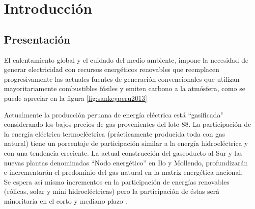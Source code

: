 

\chapter{Introducción}


\section{Presentación} %

El calentamiento global y el cuidado del medio ambiente, impone la necesidad de generar electricidad con recursos energéticos renovables que reemplacen progresivamente las actuales fuentes de generación convencionales que utilizan mayoritariamente combustibles fósiles y emiten carbono a la atmósfera, como se puede apreciar en la figura \ref{fig:sankeyperu2013}

Actualmente la producción peruana de energía eléctrica está “gasificada” considerando los bajos precios de gas provenientes  del lote 88. La participación de la energía eléctrica termoeléctrica (prácticamente producida toda con gas natural) tiene un porcentaje de participación similar a la energía hidroeléctrica y con una tendencia creciente. 
La actual construcción del gaseoducto al Sur y las nuevas plantas denominadas “Nodo energético” en Ilo y Mollendo, profundizarán e incrementarán el predominio del gas natural en la matriz energética nacional. Se espera así mismo incrementos en la participación de energías renovables (eólicas, solar y mini hidroeléctricas) pero  la participación de éstas  será minoritaria en el corto y mediano plazo \citep{coes_memoria_2016}.

